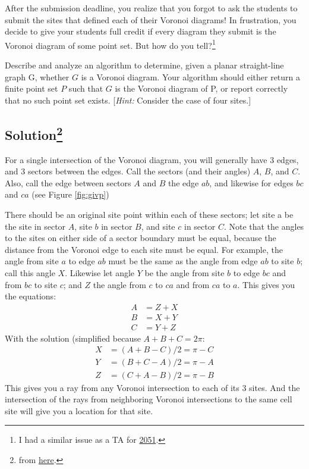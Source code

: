 \documentclass[14pt]{extreport}
\begin{document}
    \vspace{3mm}
    After the submission deadline, you realize that you forgot to ask the students to submit the sites that defined each of their Voronoi diagrams! In frustration, you decide to give your students full credit if every diagram they submit is the Voronoi diagram of some point set. But how do you tell?\footnote{I had a similar issue as a TA for \href{https://github.com/sar-mo/CS2051-HonorsDiscreteMath/blob/main/sp23/hw-supplements/hw3-supp/images/colored_map2.pdf}{2051}.}

    \vspace{3mm}
    Describe and analyze an algorithm to determine, given a planar straight-line graph G, whether $G$ is a Voronoi diagram. Your algorithm should either return a finite point set $P$ such that $G$ is the Voronoi diagram of P, or report correctly that no such point set exists. [\textit{Hint:} Consider the case of four sites.]

\subsection*{Solution\footnote{from \href{https://arxiv.org/pdf/1308.5550.pdf}{here}.}}
    For a single intersection of the Voronoi diagram, you will generally have 3 edges, and 3 sectors between the edges. Call the sectors (and their angles) $A$, $B$, and $C$. Also, call the edge between sectors $A$ and $B$ the edge $ab$, and likewise for edges $bc$ and $ca$ (see Figure \ref*{fig:givp})

    \vspace{3mm}
    There should be an original site point within each of these sectors; let site a be the site in sector $A$, site $b$ in sector $B$, and site $c$ in sector $C$. Note that the angles to the sites on either side of a sector boundary must be equal, because the distance from the Voronoi edge to each site must be equal. For example, the angle from site $a$ to edge $ab$ must be the same as the angle from edge $ab$ to site $b$; call this angle $X$. Likewise let angle $Y$ be the angle from site $b$ to edge $bc$ and from $bc$ to site $c$; and $Z$ the angle from $c$ to $ca$ and from $ca$ to $a$. This gives you the equations:
    \begin{align*}
        A &= Z + X \\
        B &= X + Y \\
        C &= Y + Z
    \end{align*}
    With the solution (simplified because $A + B + C = 2\pi$:
    \begin{align*}
        X &= (A + B - C)/2 = \pi - C \\
        Y &= (B + C - A)/2 = \pi - A \\
        Z &= (C + A - B)/2 = \pi - B
    \end{align*}
    This gives you a ray from any Voronoi intersection to each of its 3 sites. And the intersection of the rays from neighboring Voronoi intersections to the same cell site will give you a location for that site.
\end{document}
